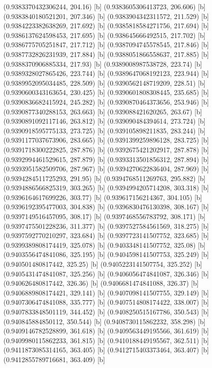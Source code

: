 {{{(0.9383370432306244, 204.16) [b] 
(0.9383605306413723, 206.606) [b] 
(0.9383840180521201, 207.346) [b] 
(0.9383904342311572, 211.529) [b] 
(0.9384223382638269, 217.692) [b] 
(0.9385818584271756, 217.694) [b] 
(0.9386137624598453, 217.695) [b] 
(0.938645666492515, 217.702) [b] 
(0.9386775705251847, 217.712) [b] 
(0.9387094745578545, 217.846) [b] 
(0.9387732826231939, 217.884) [b] 
(0.9388051866558637, 217.885) [b] 
(0.9388370906885334, 217.93) [b] 
(0.9389008987538728, 223.74) [b] 
(0.9389328027865426, 223.744) [b] 
(0.9389647068192123, 223.944) [b] 
(0.9389952095034485, 228.509) [b] 
(0.9390562148719209, 228.51) [b] 
(0.9390600343163654, 230.425) [b] 
(0.9390601808308445, 235.685) [b] 
(0.9390836682415924, 245.282) [b] 
(0.9390870464373656, 253.946) [b] 
(0.9390877340288153, 263.663) [b] 
(0.939088421620265, 263.67) [b] 
(0.9390891092117146, 263.812) [b] 
(0.939090484394614, 273.724) [b] 
(0.9390918595775133, 273.725) [b] 
(0.939105898211835, 283.244) [b] 
(0.9391177037673906, 283.665) [b] 
(0.9391399259896128, 283.725) [b] 
(0.9391718300222825, 287.876) [b] 
(0.9392675421202917, 287.878) [b] 
(0.9392994461529615, 287.879) [b] 
(0.9393313501856312, 287.894) [b] 
(0.9393951582509706, 287.967) [b] 
(0.9394270622836404, 287.969) [b] 
(0.9394284511725293, 291.95) [b] 
(0.9394768511269763, 295.882) [b] 
(0.9394886566825319, 303.265) [b] 
(0.9394994205714208, 303.318) [b] 
(0.9396164617699226, 303.77) [b] 
(0.939617156214367, 304.105) [b] 
(0.9396192395477003, 304.838) [b] 
(0.9396830476130398, 308.167) [b] 
(0.9397149516457095, 308.17) [b] 
(0.9397468556783792, 308.171) [b] 
(0.9397475501228236, 311.377) [b] 
(0.9397527584561569, 318.275) [b] 
(0.9397592770210297, 323.684) [b] 
(0.9397723141507752, 323.685) [b] 
(0.9399389808174419, 325.078) [b] 
(0.9403348141507752, 325.08) [b] 
(0.9403556474841086, 325.195) [b] 
(0.9404598141507753, 325.249) [b] 
(0.940501480817442, 325.25) [b] 
(0.9405223141507754, 325.252) [b] 
(0.9405431474841087, 325.256) [b] 
(0.9406056474841087, 326.346) [b] 
(0.940626480817442, 326.36) [b] 
(0.9406681474841088, 326.37) [b] 
(0.9406889808174421, 329.141) [b] 
(0.9407098141507755, 329.149) [b] 
(0.9407306474841088, 335.777) [b] 
(0.9407514808174422, 338.007) [b] 
(0.9407833848501119, 344.452) [b] 
(0.9408250515167786, 350.543) [b] 
(0.940845884850112, 350.544) [b] 
(0.9408730115862232, 358.298) [b] 
(0.9409146782528899, 361.618) [b] 
(0.9409563449195566, 361.619) [b] 
(0.9409980115862233, 361.815) [b] 
(0.9410188449195567, 362.511) [b] 
(0.9411873085314165, 363.405) [b] 
(0.9412715403373464, 363.407) [b] 
(0.9412855789716681, 363.409) [b] 
}}}
